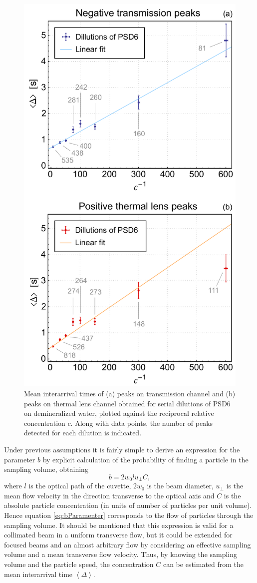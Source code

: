 \documentclass[9pt,twocolumn,twoside]{osajnl}
\begin{document}
\begin{figure}[t!]
	\centering \includegraphics[width=.46\textwidth]{figures/InterarrivalTimes.pdf}
	\caption{Mean interarrival times of (a) peaks on transmission channel and (b) peaks on thermal lens channel obtained for serial dilutions of PSD6 on demineralized water, plotted against the reciprocal relative concentration $c$. Along with data points, the number of peaks detected for each dilution is indicated.}
	\label{fig:InterarrivalTimes}
\end{figure}

Under previous assumptions it is fairly simple to derive an expression for the parameter $b$ by explicit calculation of the probability of finding a particle in the sampling volume, obtaining
\begin{equation}
	b = 2 w_0 l u_\perp C,
\label{eq:bParamenter}
\end{equation}
where $l$ is the optical path of the cuvette, $2 w_0$ is the beam diameter, $u_\perp$ is the mean flow velocity in the direction transverse to the optical axis and $C$ is the absolute particle concentration (in units of number of particles per unit volume). Hence equation \ref{eq:bParamenter} corresponds to the flow of particles through the sampling volume. It should be mentioned that this expression is valid for a collimated beam in a uniform transverse flow, but it could be extended for focused beams and an almost arbitrary flow by considering an effective sampling volume and a mean transverse flow velocity. Thus, by knowing the sampling volume and the particle speed, the concentration $C$ can be estimated from the mean interarrival time $\left\langle \Delta \right\rangle$.
\end{document}
